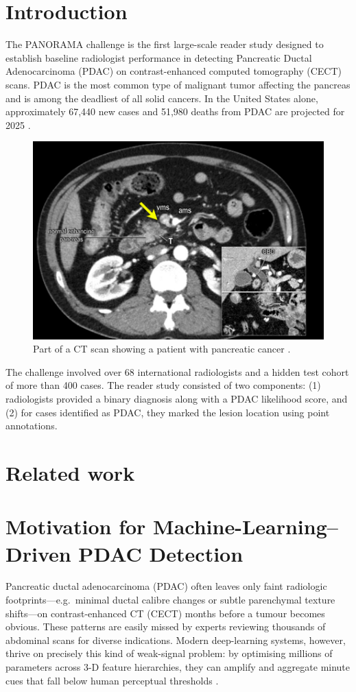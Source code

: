 \documentclass[conference]{IEEEtran}
\begin{document}
\section{Introduction}
The PANORAMA challenge \cite{b5} is the first large-scale reader study designed to establish baseline radiologist performance in detecting Pancreatic Ductal Adenocarcinoma (PDAC) on contrast-enhanced computed tomography (CECT) scans. PDAC is the most common type of malignant tumor affecting the pancreas and is among the deadliest of all solid cancers. In the United States alone, approximately 67,440 new cases and 51,980 deaths from PDAC are projected for 2025 \cite{b2}.

\begin{figure}[H]
\centering
\includegraphics[width=0.75\linewidth]{pancreatic_cancer.jpg}
\caption{Part of a CT scan showing a patient with pancreatic cancer \cite{b6}.}
\label{fig:ct_scan}
\end{figure}

The challenge involved over 68 international radiologists and a hidden test cohort of more than 400 cases. The reader study consisted of two components: (1) radiologists provided a binary diagnosis along with a PDAC likelihood score, and (2) for cases identified as PDAC, they marked the lesion location using point annotations.

\section{Related work}
\section{Motivation for Machine-Learning–Driven PDAC Detection}
Pancreatic ductal adenocarcinoma (PDAC) often leaves only faint radiologic footprints—e.g.\ minimal ductal calibre changes or subtle parenchymal texture shifts—on contrast-enhanced CT (CECT) months before a tumour becomes obvious.  These patterns are easily missed by experts reviewing thousands of abdominal scans for diverse indications.  Modern deep-learning systems, however, thrive on precisely this kind of weak-signal problem: by optimising millions of parameters across 3-D feature hierarchies, they can amplify and aggregate minute cues that fall below human perceptual thresholds \cite{b7, b8}.
\end{document}
